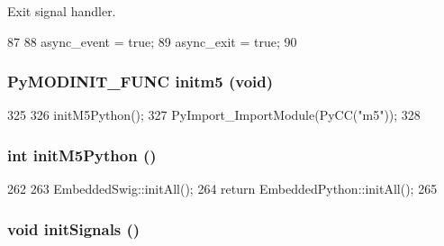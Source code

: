 Exit signal handler. 


\begin{DoxyCode}
87 {
88     async_event = true;
89     async_exit = true;
90 }
\end{DoxyCode}
\hypertarget{init_8hh_a0315a0cf1d812b58eb30d8c40e4f83f7}{
\subsubsection[{initm5}]{\setlength{\rightskip}{0pt plus 5cm}PyMODINIT\_\-FUNC initm5 (void)}}
\label{init_8hh_a0315a0cf1d812b58eb30d8c40e4f83f7}



\begin{DoxyCode}
325 {
326     initM5Python();
327     PyImport_ImportModule(PyCC("m5"));
328 }
\end{DoxyCode}
\hypertarget{init_8hh_a3b22eeb5fc94acc80cbbf4d9baa19ea2}{
\subsubsection[{initM5Python}]{\setlength{\rightskip}{0pt plus 5cm}int initM5Python ()}}
\label{init_8hh_a3b22eeb5fc94acc80cbbf4d9baa19ea2}



\begin{DoxyCode}
262 {
263     EmbeddedSwig::initAll();
264     return EmbeddedPython::initAll();
265 }
\end{DoxyCode}
\hypertarget{init_8hh_a8e6d6582b28c82a93332d8f8fc331c71}{
\subsubsection[{initSignals}]{\setlength{\rightskip}{0pt plus 5cm}void initSignals ()}}
\label{init_8hh_a8e6d6582b28c82a93332d8f8fc331c71}



